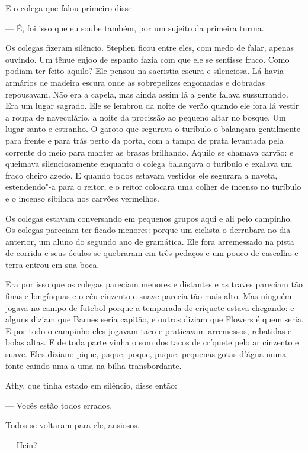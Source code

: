 E o colega que falou primeiro disse:

 --- É, foi isso que eu soube também, por um sujeito da primeira turma.

Os colegas fizeram silêncio. Stephen ficou entre eles, com medo de
falar, apenas ouvindo. Um tênue enjoo de espanto fazia com que ele se
sentisse fraco. Como podiam ter feito aquilo? Ele pensou na sacristia
escura e silenciosa. Lá havia armários de madeira escura onde as
sobrepelizes engomadas e dobradas repousavam. Não era a capela, mas
ainda assim lá a gente falava sussurrando. Era um lugar sagrado. Ele se
lembrou da noite de verão quando ele fora lá vestir a roupa de
naveculário, a noite da procissão ao pequeno altar no bosque. Um lugar
santo e estranho. O garoto que segurava o turíbulo o balançara
gentilmente para frente e para trás perto da porta, com a tampa de
prata levantada pela corrente do meio para manter as brasas brilhando.
Aquilo se chamava carvão: e queimava silenciosamente enquanto o colega
balançava o turíbulo e exalava um fraco cheiro azedo. E quando todos
estavam vestidos ele segurara a naveta, estendendo"-a para o reitor, e o
reitor colocara uma colher de incenso no turíbulo e o incenso sibilara
nos carvões vermelhos.

Os colegas estavam conversando em pequenos grupos aqui e ali pelo
campinho. Os colegas pareciam ter ficado menores: porque um ciclista o
derrubara no dia anterior, um aluno do segundo ano de gramática. Ele
fora arremessado na pista de corrida e seus óculos se quebraram em três
pedaços e um pouco de cascalho e terra entrou em sua boca.

Era por isso que os colegas pareciam menores e distantes e as traves
pareciam tão finas e longínquas e o céu cinzento e suave parecia tão
mais alto. Mas ninguém jogava no campo de futebol porque a temporada de
críquete estava chegando: e alguns diziam que Barnes seria capitão, e
outros diziam que Flowers é quem seria. E por todo o campinho eles
jogavam taco e praticavam arremessos, rebatidas e bolas altas. E de
toda parte vinha o som dos tacos de críquete pelo ar cinzento e suave.
Eles diziam: pique, paque, poque, puque: pequenas gotas d’água numa
fonte caindo uma a uma na bilha transbordante.

Athy, que tinha estado em silêncio, disse então:

 --- Vocês estão todos errados.

Todos se voltaram para ele, ansiosos.

 --- Hein?

